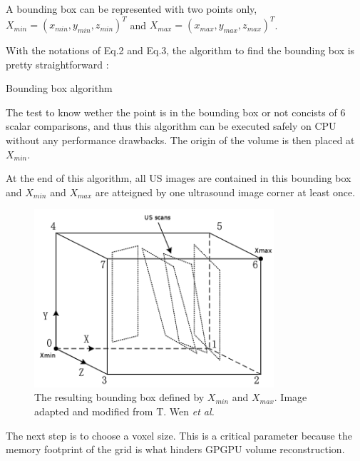\documentclass[12pt,journal,compsoc]{IEEEtran}
\begin{document}
A bounding box can be represented with two points only, $X_{min} = (x_{min},y_{min},z_{min})^T$ and $X_{max} = (x_{max}, y_{max}, z_{max})^T$.

With the notations of Eq.2 and Eq.3, the algorithm to find the bounding box is pretty straightforward :

\begin{samepage}
\begin{algorithm}
\caption{Bounding box algorithm}
\label{}
\end{algorithm}
\end{samepage}

The test to know wether the point is in the bounding box or not concists of 6 scalar comparisons, and thus this algorithm can be executed safely on CPU without any performance drawbacks.
The origin of the volume is then placed at $X_{min}$.

At the end of this algorithm, all US images are contained in this bounding box and $X_{min}$ and $X_{max}$ are atteigned by one ultrasound image corner at least once.


\begin{figure}[ht!]
\centering
\includegraphics[width=3.5in]{bounding_box}
\caption{The resulting bounding box defined by $X_{min}$ and $X_{max}$. Image adapted and modified from T. Wen \textit{et al.} \cite{2}}
\label{fig_2}
\end{figure}

The next step is to choose a voxel size. This is a critical parameter because the memory footprint of the grid is what hinders GPGPU volume reconstruction. 
\end{document}
